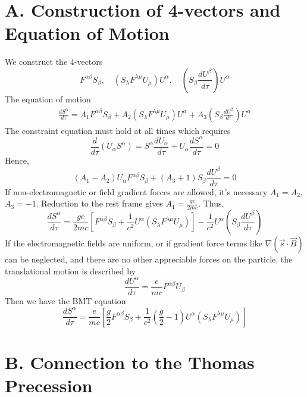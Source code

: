 \documentclass{article}
\begin{document}
	\section*{A. Construction of 4-vectors and Equation of Motion}
	
	We construct the 4-vectors
	\[
	F^{\alpha\beta}S_\beta, \quad (S_{\lambda}F^{\lambda\mu}U_\mu)U^\alpha, \quad \left(S_\beta \frac{dU^\beta}{d\tau}\right)U^\alpha
	\]
	The equation of motion
	\begin{align*}
		\frac{dS^\alpha}{d\tau} = A_1 F^{\alpha\beta}S_\beta + A_2 (S_\lambda F^{\lambda\mu}U_\mu)U^\alpha + A_3 \left(S_\beta \frac{dU^\beta}{d\tau}\right)U^\alpha
	\end{align*}
	The constraint equation must hold at all times which requires
	\[
	\frac{d}{d\tau}(U_\alpha S^\alpha) = S^\alpha \frac{dU_\alpha}{d\tau} + U_\alpha \frac{dS^\alpha}{d\tau} = 0
	\]
	Hence,
	\[
	(A_1 - A_2)U_\alpha F^{\alpha\beta}S_\beta + (A_3+1)S_\beta \frac{dU^\beta}{d\tau} = 0
	\]
	If non-electromagnetic or field gradient forces are allowed, it's necessary $A_1=A_2$, $A_3=-1$. Reduction to the rest frame gives $A_1 = \frac{ge}{2mc}$.
	Thus,
	\[
	\frac{dS^\alpha}{d\tau} = \frac{ge}{2mc} \left[ F^{\alpha\beta}S_\beta + \frac{1}{c^2} U^\alpha (S_\lambda F^{\lambda\mu}U_\mu) \right] - \frac{1}{c^2} U^\alpha \left(S_\beta \frac{dU^\beta}{d\tau}\right)
	\]
	If the electromagnetic fields are uniform, or if gradient force terms like $\nabla(\vec{s} \cdot \vec{B})$ can be neglected, and there are no other appreciable forces on the particle, the translational motion is described by
	\[
	\frac{dU^\alpha}{d\tau} = \frac{e}{mc} F^{\alpha\beta}U_\beta
	\]
	Then we have the BMT equation
	\[
	\frac{dS^\alpha}{d\tau} = \frac{e}{mc} \left[ \frac{g}{2} F^{\alpha\beta}S_\beta + \frac{1}{c^2} (\frac{g}{2}-1)U^\alpha (S_\lambda F^{\lambda\mu}U_\mu) \right]
	\]
	
	\section*{B. Connection to the Thomas Precession}
	
\end{document}
